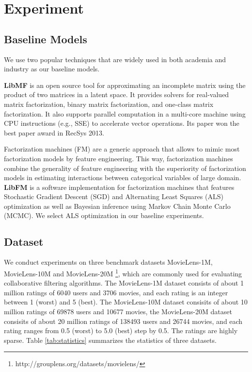 \documentclass{sig-alternate-05-2015}
\begin{document}
\section{Experiment}

\subsection{Baseline Models}
We use two popular techniques that are widely used
in both academia and industry as our baseline models.

\textbf{LibMF} is an open source tool
for approximating an incomplete matrix using the product of
two matrices in a latent space.
It provides solvers for real-valued matrix factorization,
binary matrix factorization, and one-class matrix factorization.
It also supports parallel computation in a multi-core machine
using CPU instructions (e.g., SSE) to accelerate vector operations.
Its paper \cite{chin2015fast} won the best paper award
in RecSys 2013.

Factorization machines (FM) are a generic approach that
allows to mimic most factorization models by feature engineering.
This way, factorization machines combine the generality of
feature engineering with the superiority of factorization models
in estimating interactions between categorical variables of large domain.
\textbf{LibFM} \cite{rendle2012factorization} is a software implementation
for factorization machines that features
Stochastic Gradient Descent (SGD) and
Alternating Least Squares (ALS) optimization as well as
Bayesian inference using Markov Chain Monte Carlo (MCMC).
We select ALS optimization in our baseline experiments.

\subsection{Dataset}
We conduct experiments on three benchmark datasets MovieLens-1M, MovieLens-10M and MovieLens-20M
\footnote{http://grouplens.org/datasets/movielens/},
which are commonly used for evaluating collaborative filtering algorithms.
The MovieLens-1M dataset consists of about 1 million ratings of 6040 users and 3706 movies,
and each rating is an integer between 1 (worst) and 5 (best).
The MovieLens-10M dataset consisits of about 10 million ratings of 69878 users and 10677 movies,
the MovieLens-20M dataset consisits of about 20 million ratings of 138493 users and 26744 movies,
and each rating ranges from 0.5 (worst) to 5.0 (best) step by 0.5.
The ratings are highly sparse.
Table \ref{tab:statistics} summarizes the statistics of three datasets.
\end{document}
